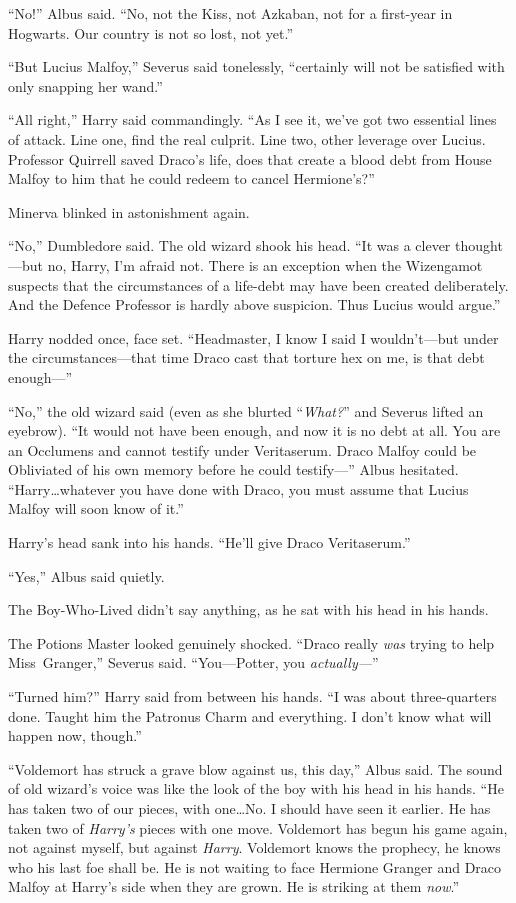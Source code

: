 “No!” Albus said. “No, not the Kiss, not Azkaban, not for a first-year in Hogwarts. Our country is not so lost, not yet.”

“But Lucius Malfoy,” Severus said tonelessly, “certainly will not be satisfied with only snapping her wand.”

“All right,” Harry said commandingly. “As I see it, we’ve got two essential lines of attack. Line one, find the real culprit. Line two, other leverage over Lucius. Professor Quirrell saved Draco’s life, does that create a blood debt from House Malfoy to him that he could redeem to cancel Hermione’s?”

Minerva blinked in astonishment again.

“No,” Dumbledore said. The old wizard shook his head. “It was a clever thought—but no, Harry, I’m afraid not. There is an exception when the Wizengamot suspects that the circumstances of a life-debt may have been created deliberately. And the Defence Professor is hardly above suspicion. Thus Lucius would argue.”

Harry nodded once, face set. “Headmaster, I know I said I wouldn’t—but under the circumstances—that time Draco cast that torture hex on me, is that debt enough—”

“No,” the old wizard said (even as she blurted “\emph{What?}” and Severus lifted an eyebrow). “It would not have been enough, and now it is no debt at all. You are an Occlumens and cannot testify under Veritaserum. Draco Malfoy could be Obliviated of his own memory before he could testify—” Albus hesitated. “Harry…whatever you have done with Draco, you must assume that Lucius Malfoy will soon know of it.”

Harry’s head sank into his hands. “He’ll give Draco Veritaserum.”

“Yes,” Albus said quietly.

The Boy-Who-Lived didn’t say anything, as he sat with his head in his hands.

The Potions Master looked genuinely shocked. “Draco really \emph{was} trying to help Miss~Granger,” Severus said. “You—Potter, you \emph{actually—}”

“Turned him?” Harry said from between his hands. “I was about three-quarters done. Taught him the Patronus Charm and everything. I don’t know what will happen now, though.”

“Voldemort has struck a grave blow against us, this day,” Albus said. The sound of old wizard’s voice was like the look of the boy with his head in his hands. “He has taken two of our pieces, with one…No. I should have seen it earlier. He has taken two of \emph{Harry’s} pieces with one move. Voldemort has begun his game again, not against myself, but against \emph{Harry}. Voldemort knows the prophecy, he knows who his last foe shall be. He is not waiting to face Hermione Granger and Draco Malfoy at Harry’s side when they are grown. He is striking at them \emph{now}.”

